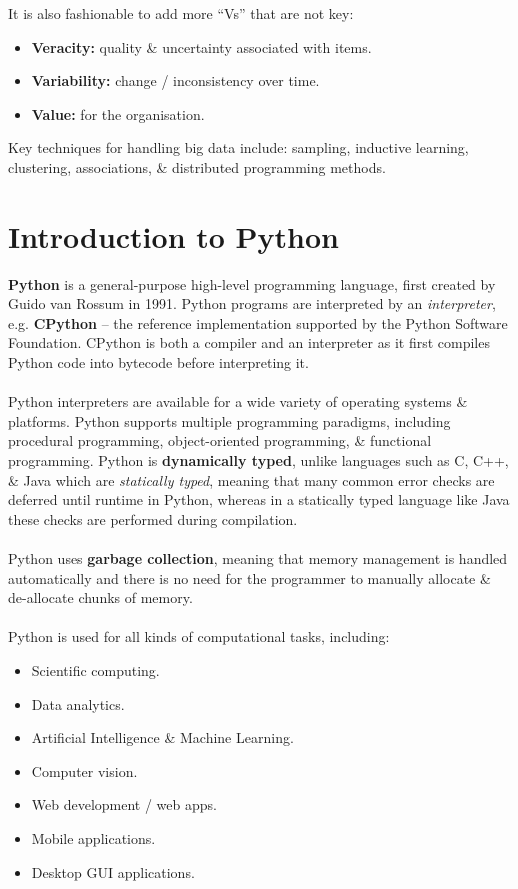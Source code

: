 \documentclass[a4paper,11pt]{article}
\begin{document}
It is also fashionable to add more ``Vs'' that are not key:
\begin{itemize}
    \item   \textbf{Veracity:} quality \& uncertainty associated with items.
    \item   \textbf{Variability:} change / inconsistency over time.
    \item   \textbf{Value:} for the organisation.
\end{itemize}

Key techniques for handling big data include: sampling, inductive learning, clustering, associations, \& distributed 
programming methods.

\section{Introduction to Python}
\textbf{Python} is a general-purpose high-level programming language, first created by Guido van Rossum in 1991.
Python programs are interpreted by an \textit{interpreter}, e.g. \textbf{CPython} -- the reference implementation
supported by the Python Software Foundation.
CPython is both a compiler and an interpreter as it first compiles Python code into bytecode before interpreting it.
\\\\
Python interpreters are available for a wide variety of operating systems \& platforms.
Python supports multiple programming paradigms, including procedural programming, object-oriented programming, \& 
functional programming.
Python is \textbf{dynamically typed}, unlike languages such as C, C++, \& Java which are \textit{statically typed},
meaning that many common error checks are deferred until runtime in Python, whereas in a statically typed language like Java
these checks are performed during compilation.
\\\\
Python uses \textbf{garbage collection}, meaning that memory management is handled automatically and there is no need for 
the programmer to manually allocate \& de-allocate chunks of memory.
\\\\
Python is used for all kinds of computational tasks, including:
\begin{itemize}
    \item   Scientific computing.
    \item   Data analytics.
    \item   Artificial Intelligence \& Machine Learning.
    \item   Computer vision.
    \item   Web development / web apps.
    \item   Mobile applications.
    \item   Desktop GUI applications.
\end{itemize}
\end{document}
